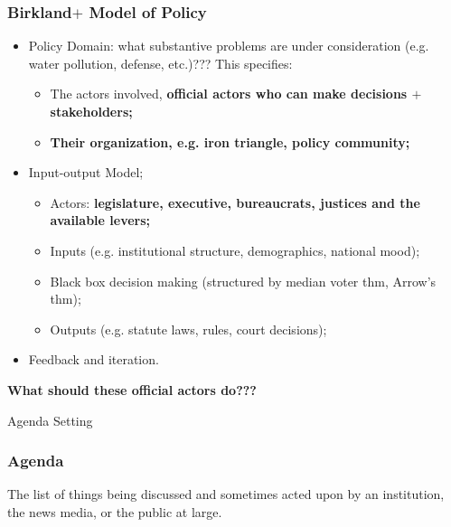 \documentclass[aspectratio=169]{beamer}
\theoremstyle{principle}
\begin{document}
\begin{frame}
\frametitle{Birkland$+$ Model of Policy}
\begin{itemize}
\item Policy Domain: what substantive problems are under consideration (e.g. water pollution, defense, etc.)???  This specifies:
\begin{itemize}
\item The actors involved, \textbf{official actors who can make decisions $+$ stakeholders;} 
\item \textbf{Their organization, e.g. iron triangle, policy community;}
\end{itemize} 
\bigskip
\item \color{black}Input-output Model;
\begin{itemize}
\item Actors: \textbf{legislature, executive, bureaucrats, justices and the available levers;}
\item Inputs (e.g. institutional structure, demographics, national mood);
\item Black box decision making (structured by median voter thm, Arrow's thm);
\item Outputs (e.g. statute laws, rules, court decisions);
\end{itemize}
\bigskip
\item Feedback and iteration.
\end{itemize}
\end{frame}

\begin{frame}
\begin{center}
\Huge \textbf{What should these official actors do???}
\end{center}
\end{frame}

\begin{frame}
\begin{center}
\Huge Agenda Setting
\end{center}
\end{frame}

\begin{frame}
\frametitle{Agenda}
\begin{center}
\Large The list of things being discussed and sometimes acted upon by an institution, the news media, or the public at large.
\end{center}
\end{frame}
\end{document}
